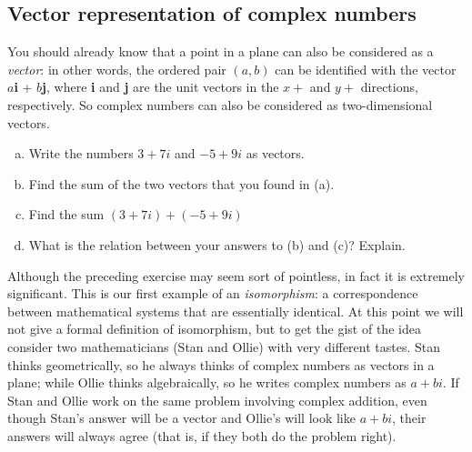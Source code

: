 \subsection{Vector representation of complex numbers}

You should already know that a point in a plane can also be considered as a \emph{vector}: in other words, the ordered pair $(a,b)$ can be identified with the vector $a$\textbf{i} + $b$\textbf{j}, where \textbf{i} and \textbf{j} are the unit vectors in the $x+$ and $y+$ directions, respectively. So complex numbers can also be considered as two-dimensional vectors. 

\begin{exercise}{19} 
\begin{enumerate}[(a)]
\item
Write the numbers $3 + 7i$  and $-5 + 9i$ as  vectors.
\item
Find the sum of the two vectors that you found in (a).
\item
 Find the sum $(3 + 7i) + (-5 + 9i)$
\item
What is the relation between your answers to (b) and (c)? Explain.
\end{enumerate}
\end{exercise}

Although the preceding exercise may seem sort of pointless, in fact it is extremely significant. This is our first example of an \emph{isomorphism}: a correspondence between mathematical systems that are essentially identical. At this point we will not give a formal definition of isomorphism, but 
to get the gist of the idea consider two mathematicians (Stan and Ollie) with very different tastes. Stan thinks geometrically, so he always thinks of complex numbers as vectors in a plane; while Ollie thinks algebraically, so he writes complex numbers as $a + bi$. If Stan and Ollie work on the same problem involving complex addition, even though Stan's answer will be a vector and Ollie's will look like $a + bi$, their answers will always agree (that is, if they both do the problem right).

